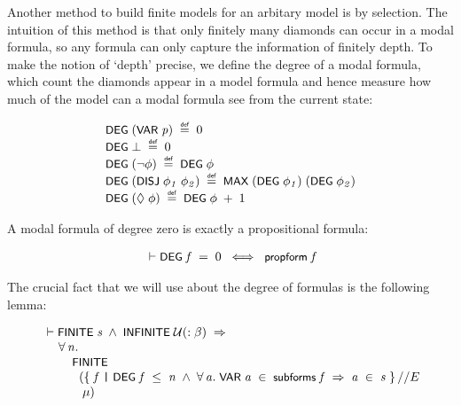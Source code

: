 \documentclass[letterpaper]{article}
\renewcommand{\HOLConst}[1]{{\textsf{\upshape\small #1}}}
\newenvironment{holmath}{\begin{displaymath}\begin{array}{l}}{\end{array}\end{displaymath}\ignorespacesafterend}
\begin{document}
Another method to build finite models for an arbitary model is by selection. The intuition of this method is that only finitely many diamonds can occur in a modal formula, so any formula can only capture the information of finitely depth. To make the notion of `depth' precise, we define the degree of a modal formula, which count the diamonds appear in a model formula and hence measure how much of the model can a modal formula see from the current state:

\begin{holmath}
  \HOLConst{DEG}\;(\HOLConst{VAR}\;\HOLFreeVar{p})\;\HOLSymConst{\HOLTokenDefEquality{}}\;\HOLNumLit{0}\\
\HOLConst{DEG}\;\HOLSymConst{\ensuremath{\bot}}\;\HOLSymConst{\HOLTokenDefEquality{}}\;\HOLNumLit{0}\\
\HOLConst{DEG}\;(\HOLSymConst{\HOLTokenNeg{}}\HOLFreeVar{\ensuremath{\phi}})\;\HOLSymConst{\HOLTokenDefEquality{}}\;\HOLConst{DEG}\;\HOLFreeVar{\ensuremath{\phi}}\\
\HOLConst{DEG}\;(\HOLConst{DISJ}\;\HOLFreeVar{\ensuremath{\phi\sb{1}}}\;\HOLFreeVar{\ensuremath{\phi\sb{2}}})\;\HOLSymConst{\HOLTokenDefEquality{}}\;\HOLConst{MAX}\;(\HOLConst{DEG}\;\HOLFreeVar{\ensuremath{\phi\sb{1}}})\;(\HOLConst{DEG}\;\HOLFreeVar{\ensuremath{\phi\sb{2}}})\\
\HOLConst{DEG}\;(\HOLSymConst{\ensuremath{\Diamond}}\;\HOLFreeVar{\ensuremath{\phi}})\;\HOLSymConst{\HOLTokenDefEquality{}}\;\HOLConst{DEG}\;\HOLFreeVar{\ensuremath{\phi}}\;\HOLSymConst{\ensuremath{+}}\;\HOLNumLit{1}
\end{holmath}

A modal formula of degree zero is exactly a propositional formula:

\begin{holmath}
  \ensuremath{\HOLTokenTurnstile}\HOLConst{DEG}\;\HOLFreeVar{f}\;\HOLSymConst{=}\;\HOLNumLit{0}\;\HOLSymConst{\HOLTokenEquiv{}}\;\HOLConst{propform}\;\HOLFreeVar{f}
\end{holmath}

The crucial fact that we will use about the degree of formulas is the following lemma:

\begin{holmath}
  \ensuremath{\HOLTokenTurnstile}\HOLConst{FINITE}\;\HOLFreeVar{s}\;\HOLSymConst{\HOLTokenConj{}}\;\HOLConst{INFINITE}\;\ensuremath{\cal{U}}(:\ensuremath{\beta})\;\HOLSymConst{\HOLTokenImp{}}\\
\;\;\;\;\;\HOLSymConst{\HOLTokenForall{}}\HOLBoundVar{n}.\\
\;\;\;\;\;\;\;\;\;\HOLConst{FINITE}\\
\;\;\;\;\;\;\;\;\;\;\;(\HOLTokenLeftbrace{}\HOLBoundVar{f}\;\HOLTokenBar{}\;\HOLConst{DEG}\;\HOLBoundVar{f}\;\HOLSymConst{\HOLTokenLeq{}}\;\HOLBoundVar{n}\;\HOLSymConst{\HOLTokenConj{}}\;\HOLSymConst{\HOLTokenForall{}}\HOLBoundVar{a}.\;\HOLConst{VAR}\;\HOLBoundVar{a}\;\HOLSymConst{\HOLTokenIn{}}\;\HOLConst{subforms}\;\HOLBoundVar{f}\;\HOLSymConst{\HOLTokenImp{}}\;\HOLBoundVar{a}\;\HOLSymConst{\HOLTokenIn{}}\;\HOLFreeVar{s}\HOLTokenRightbrace{}\HOLSymConst{//E}\\
\;\;\;\;\;\;\;\;\;\;\;\;\HOLFreeVar{\ensuremath{\mu}})
\end{holmath}
\end{document}
